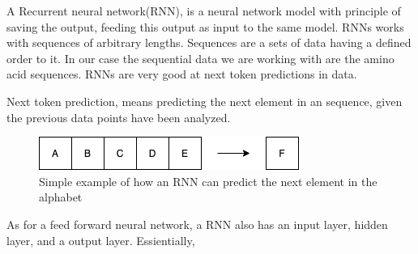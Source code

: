 A Recurrent neural network(RNN), is a neural network model with principle of saving the output, feeding this output as input to the same model. RNNs works with sequences of arbitrary lengths. Sequences are a sets of data having a defined order to it. In our case the sequential data we are working with are the amino acid sequences. RNNs are very good at next token predictions in data.

\noindent
Next token prediction, means predicting the next element in an sequence, given the previous data points have been analyzed.

\begin{figure}[!ht]
  \centering
  \includegraphics[scale=0.4]{latex/IMGs/AlphabetPred.png}
  \caption{Simple example of how an RNN can predict the next element in the alphabet}\label{Baseline:before}
\end{figure}

\noindent
As for a feed forward neural network, a RNN also has an input layer, hidden layer, and a output layer. Essientially,